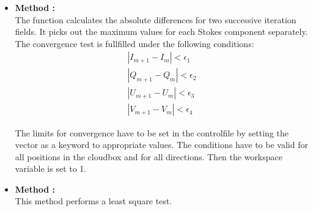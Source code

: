 \begin{itemize}
\item {\bf Method :}\\
The function calculates the absolute differences for two successive
iteration fields. It picks out the maximum values for each Stokes 
component separately. The convergence test is fullfilled under the
following conditions:
\begin{eqnarray}
|I_{m+1} - I_m| < \epsilon_1    \\
|Q_{m+1} - Q_m| < \epsilon_2    \\
|U_{m+1} - U_m| < \epsilon_3    \\
|V_{m+1} - V_m| < \epsilon_4     
\end{eqnarray}

The limits for convergence have to be set in the controlfile by 
setting the vector  as a keyword 
to appropriate values.
The conditions have to be valid for all positions in the cloudbox 
and for all directions.
Then the workspace variable  is set to 1.

\item {\bf Method :}\\
This method performs a least square test.
\end{itemize}



 


